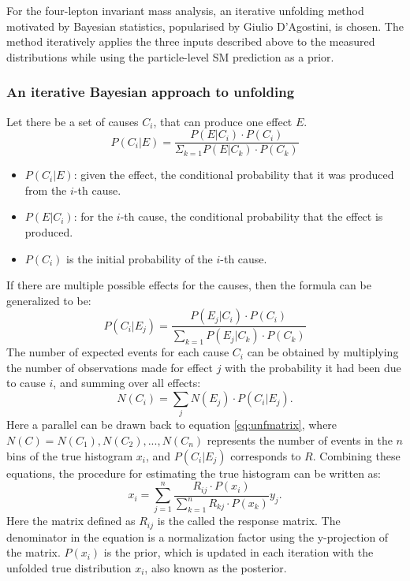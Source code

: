 For the four-lepton invariant mass analysis, an iterative unfolding method motivated by Bayesian statistics, popularised by Giulio D’Agostini, is chosen. The method iteratively applies the three inputs described above to the measured distributions while using the particle-level SM prediction as a prior.

\subsubsection{An iterative Bayesian approach to unfolding}
\label{ssec:bayesianunfolding}
Let there be a set of causes $C_i$, that can produce one effect $E$. 
\begin{equation}
    P(C_i|E)=\dfrac{P(E|C_i)\cdot P(C_i)}{\Sigma_{k=1}P(E|C_k)\cdot P(C_k)}
\end{equation}

\begin{itemize}
    \item $P(C_i|E)$: given the effect, the conditional probability that it was produced from the $i$-th cause.
    \item $P(E|C_i)$: for the $i$-th cause, the conditional probability that the effect is produced.
    \item $P(C_i)$ is the initial probability of the $i$-th cause.
\end{itemize}
If there are multiple possible effects for the causes, then the formula can be generalized to be:
\begin{equation}
    P(C_i|E_j)=\dfrac{P(E_j|C_i)\cdot P(C_i)}{\sum_{k=1}P(E_j|C_k)\cdot P(C_k)}
\end{equation}
The number of expected events for each cause $C_i$ can be obtained by multiplying the number of observations made for effect $j$ with the probability it had been due to cause $i$, and summing over all effects:
\begin{equation} \label{eq:numcause}
    N(C_i)=\sum_jN(E_j)\cdot P(C_i|E_j).
\end{equation}
Here a parallel can be drawn back to equation \ref{eq:unfmatrix}, where $N(C)={N(C_1),N(C_2),...,N(C_n)}$ represents the number of events in the $n$ bins of the true histogram $x_i$, and $P(C_i|E_j)$ corresponds to $R$. Combining these equations, the procedure for estimating the true histogram can be written as:
\begin{equation}\label{eq:bayesianunfolding}
    x_i=\sum_{j=1}^n\dfrac{R_{ij}\cdot P(x_i)}{\sum_{k=1}^nR_{kj}\cdot P(x_k)}y_j.
\end{equation}
Here the matrix defined as $R_{ij}$ is the called the response matrix. The denominator in the equation is a normalization factor using the y-projection of the matrix. $P(x_i)$ is the prior, which is updated in each iteration with the unfolded true distribution $x_i$, also known as the posterior.

